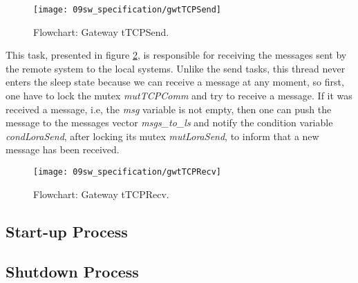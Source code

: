 \begin{figure}[H]
	\centering
	\texttt{[image: 09sw\_specification/gwtTCPSend]}
	\caption{Flowchart: Gateway tTCPSend.}
	\label{fig:gwtTCPSend}
\end{figure}

This task, presented in figure \ref{fig:gwtTCPRecv}, is responsible for receiving the messages sent by the remote system to the local systems. Unlike the send tasks, this thread never enters the sleep state because we can receive a message at any moment, so first, one have to lock the mutex \textit{mutTCPComm} and try to receive a message. If it was received a message, i.e, the \textit{msg} variable is not empty, then one can push the message to the messages vector \textit{msgs\_to\_ls} and notify the condition variable \textit{condLoraSend}, after locking its mutex \textit{mutLoraSend}, to inform that a new message has been received.

\begin{figure}[H]
	\centering
	\texttt{[image: 09sw\_specification/gwtTCPRecv]}
	\caption{Flowchart: Gateway tTCPRecv.}
	\label{fig:gwtTCPRecv}
\end{figure}

\subsection{Start-up Process}

\subsection{Shutdown Process}
